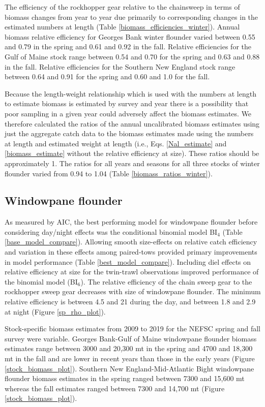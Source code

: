 \documentclass[]{article}
\begin{document}
The efficiency of the rockhopper gear relative to the chainsweep in
terms of biomass changes from year to year due primarily to
corresponding changes in the estimated numbers at length (Table
\ref{biomass_efficiencies_winter}). Annual biomass relative efficiency
for Georges Bank winter flounder varied between 0.55 and 0.79 in the
spring and 0.61 and 0.92 in the fall. Relative efficiencies for the Gulf
of Maine stock range between 0.54 and 0.70 for the spring and 0.63 and
0.88 in the fall. Relative efficiencies for the Southern New England
stock range between 0.64 and 0.91 for the spring and 0.60 and 1.0 for
the fall.

Because the length-weight relationship which is used with the numbers at
length to estimate biomass is estimated by survey and year there is a
possibility that poor sampling in a given year could adversely affect
the biomass estimates. We therefore calculated the ratios of the annual
uncalibrated biomass estimates using just the aggregate catch data to
the biomass estimates made using the numbers at length and estimated
weight at length (i.e., Eqs. \ref{Nal_estimate} and
\ref{biomass_estimate} without the relative efficiency at size). These
ratios should be approximately 1. The ratios for all years and seasons
for all three stocks of winter flounder varied from 0.94 to 1.04 (Table
\ref{biomass_ratios_winter}).

\hypertarget{windowpane-flounder}{%
\subsection{Windowpane flounder}\label{windowpane-flounder}}

As measured by AIC, the best performing model for windowpane flounder
before considering day/night effects was the conditional binomial model
BI\(_4\) (Table \ref{base_model_compare}). Allowing smooth size-effects
on relative catch efficiency and variation in these effects among
paired-tows provided primary improvements in model performance (Table
\ref{best_model_compare}). Including diel effects on relative efficiency
at size for the twin-trawl observations improved performance of the
binomial model (BI\(_6\)). The relative efficiency of the chain sweep
gear to the rockhopper sweep gear decreases with size of windowpane
flounder. The minimum relative efficiency is between 4.5 and 21 during
the day, and between 1.8 and 2.9 at night (Figure \ref{sp_rho_plot}).

Stock-specific biomass estimates from 2009 to 2019 for the NEFSC spring
and fall survey were variable. Georges Bank-Gulf of Maine windowpane
flounder biomass estimates range between 3000 and 20,300 mt in the
spring and 4700 and 18,300 mt in the fall and are lower in recent years
than those in the early years (Figure \ref{stock_biomass_plot}).
Southern New England-Mid-Atlantic Bight windowpane flounder biomass
estimates in the spring ranged between 7300 and 15,600 mt whereas the
fall estimates ranged between 7300 and 14,700 mt (Figure
\ref{stock_biomass_plot}).
\end{document}
